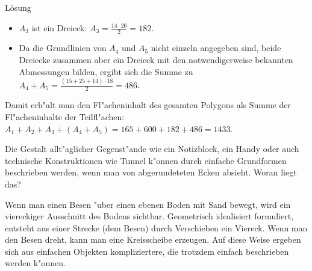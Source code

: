 \begin{MExercises}
\begin{MExercise}
\begin{MHint}{L\"osung}
\begin{itemize}
\item
$A_3$ ist ein Dreieck: $A_3=\frac{14\cdot 26}{2}=182$.
\item
Da die Grundlinien von $A_4$ und $A_5$ nicht einzeln angegeben sind,
beide Dreiecke zusammen aber ein Dreieck mit den notwendigerweise 
bekannten Abmessungen bilden, ergibt sich die Summe zu
$A_4+A_5=\frac{(15+25+14)\cdot 18}{2}=486$.
\end{itemize}
Damit erh"alt man den Fl"acheninhalt des gesamten Polygons als Summe der 
Fl"acheninhalte der Teilfl"achen: 
$A_1+A_2+A_3+(A_4+A_5)= 165+600+182+486=1433$.
\end{MHint}
\end{MExercise}

\end{MExercises}





%

\begin{MIntro}

Die Gestalt allt"aglicher Gegenst"ande wie ein Notizblock, ein Handy oder 
auch technische Konstruktionen wie Tunnel k"onnen durch einfache Grundformen
beschrieben werden, wenn man von {\glqq}abgerundeteten Ecken{\grqq} absieht.
Woran liegt das?

Wenn man einen Besen "uber einen ebenen Boden mit Sand bewegt, wird ein 
viereckiger Ausschnitt des Bodens sichtbar.
Geometrisch idealisiert formuliert, entsteht aus einer Strecke (dem Besen) 
durch Verschieben ein Viereck. Wenn man den Besen dreht, kann man eine 
Kreisscheibe erzeugen. Auf diese Weise ergeben sich aus einfachen Objekten 
kompliziertere, die trotzdem einfach beschrieben werden k"onnen.
\end{MIntro}

